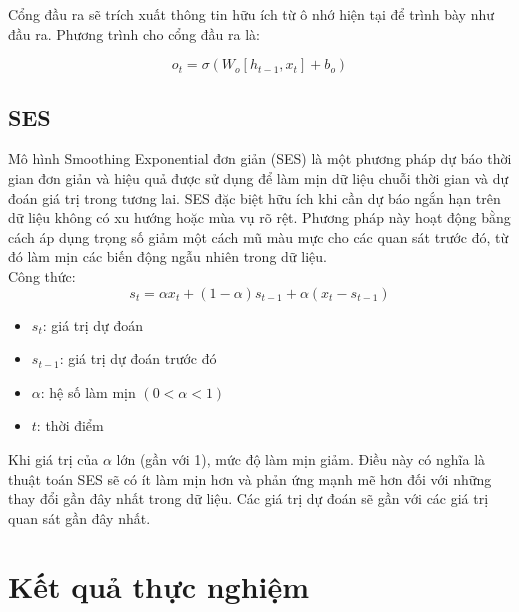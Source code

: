 \documentclass[conference]{IEEEtran}
\begin{document}
Cổng đầu ra sẽ trích xuất thông tin hữu ích từ ô nhớ hiện tại để trình bày như đầu ra. Phương trình cho cổng đầu ra là:

\begin{equation*}
    o_t = \sigma(W_o [h_{t-1}, x_t] + b_o)
\end{equation*}


\subsection{SES}
Mô hình Smoothing Exponential đơn giản (SES) là một phương pháp dự báo thời gian đơn giản và hiệu quả được sử dụng để làm mịn dữ liệu chuỗi thời gian và dự đoán giá trị trong tương lai. SES đặc biệt hữu ích khi cần dự báo ngắn hạn trên dữ liệu không có xu hướng hoặc mùa vụ rõ rệt. Phương pháp này hoạt động bằng cách áp dụng trọng số giảm một cách mũ màu mực cho các quan sát trước đó, từ đó làm mịn các biến động ngẫu nhiên trong dữ liệu.
\\
Công thức:
\begin{equation}
s_t = \alpha x_t + (1 - \alpha) s_{t-1} + \alpha (x_t - s_{t-1})
\end{equation}

\begin{itemize}
  \item $s_t$: giá trị dự đoán
  \item $s_{t-1}$: giá trị dự đoán trước đó
  \item $\alpha$: hệ số làm mịn $(0 < \alpha < 1)$
  \item $t$: thời điểm
\end{itemize}
Khi giá trị của \( \alpha \) lớn (gần với 1), mức độ làm mịn giảm. Điều này có nghĩa là thuật toán SES sẽ có ít làm mịn hơn và phản ứng mạnh mẽ hơn đối với những thay đổi gần đây nhất trong dữ liệu. Các giá trị dự đoán sẽ gần với các giá trị quan sát gần đây nhất.

\section{Kết quả thực nghiệm}
\end{document}
